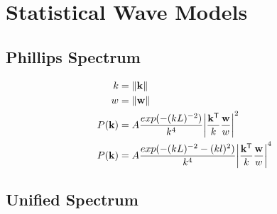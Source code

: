 \section{Statistical Wave Models}

\subsection{Phillips Spectrum}
\label{sec_phillips_spectrum}

\begin{align}
  k &= \norm{\mvec{k}}\\
  w &= \norm{\mvec{w}}\\
  P(\mvec{k}) &= A\frac{exp(-(kL)^{-2})}{k^4}\abs*{\frac{\transpose{\mvec{k}}}{k}\frac{\mvec{w}}{w}}^2\\
  P(\mvec{k}) &= A\frac{exp(-(kL)^{-2}-(kl)^2)}{k^4}\abs*{\frac{\transpose{\mvec{k}}}{k}\frac{\mvec{w}}{w}}^4
\end{align}


\subsection{Unified Spectrum}
\label{sec_unified_spectrum}

